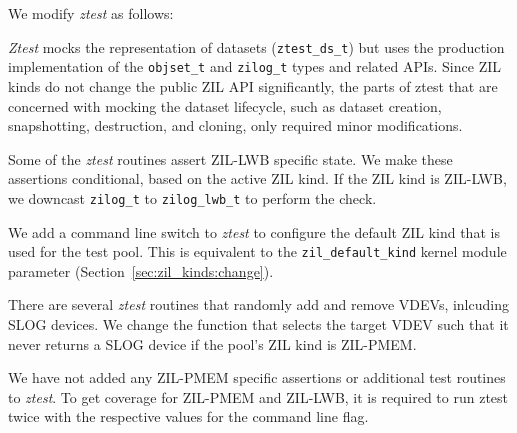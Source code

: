 \documentclass[12pt,a4paper,twoside]{book}
\begin{document}
We modify \textit{ztest} as follows:
\begin{description}[noitemsep]
    \item[Mocking]  \textit{Ztest} mocks the representation of datasets (\lstinline{ztest_ds_t}) but uses the production implementation of the \lstinline{objset_t} and \lstinline{zilog_t} types and related APIs.
        Since ZIL kinds do not change the public ZIL API significantly, the parts of ztest that are concerned with mocking the dataset lifecycle, such as dataset creation, snapshotting, destruction, and cloning, only required minor modifications.
    \item[ZIL-LWB Specific Assertions] Some of the \textit{ztest} routines assert ZIL-LWB specific state.
        We make these assertions conditional, based on the active ZIL kind.
        If the ZIL kind is ZIL-LWB, we downcast \lstinline{zilog_t} to \lstinline{zilog_lwb_t} to perform the check.
    \item[Configurable ZIL Kinds] We add a command line switch to \textit{ztest} to configure the default ZIL kind that is used for the test pool.
        This is equivalent to the \lstinline{zil_default_kind} kernel module parameter (Section~\ref{sec:zil_kinds:change}).
    \item[VDEV Management] There are several \textit{ztest} routines that randomly add and remove VDEVs, inlcuding SLOG devices.
        We change the function that selects the target VDEV such that it never returns a SLOG device if the pool's ZIL kind is ZIL-PMEM.
\end{description}
We have not added any ZIL-PMEM specific assertions or additional test routines to \textit{ztest}.
To get coverage for ZIL-PMEM and ZIL-LWB, it is required to run ztest twice with the respective values for the command line flag.
\end{document}
